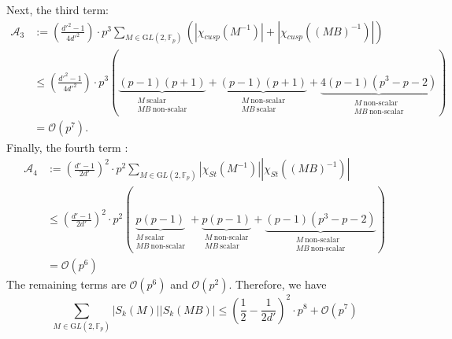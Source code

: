 \documentclass[12pt,reqno]{amsart}
\theoremstyle{plain}
\theoremstyle{definition}
\newcommand{\GL}{{\mathrm GL}}
\newcommand{\sA}{{\mathcal A}}
\newcommand{\sO}{{\mathcal O}}
\theoremstyle{remark}
\newcommand{\FF}{\mathbb{F}}
\begin{document}
Next, the third term: 
\begin{align*}
    \sA_3&:= \left({\frac{d'^2 -1}{4d'^2}}\right)\cdot p^3\sum_{M \in \GL(2, \FF_p)}\left(|\chi_{cusp}(M^{-1})| +|\chi_{cusp}((MB)^{-1})|\right) \\
    &\leq \left({\frac{d'^2 -1}{4d'^2}}\right)\cdot p^3 \left(\underbrace{(p-1)(p+1)}_{\substack{M ~ \text{scalar}\\MB~\text{non-scalar}}} + \underbrace{(p-1)(p+1)}_{\substack{M~ \text{non-scalar}\\MB ~\text{scalar}}} + \underbrace{4(p-1)(p^3-p-2)}_{\substack{M~ \text{non-scalar}\\ MB ~\text{non-scalar}}} \right)\\
    &= \sO(p^7).
\end{align*}
Finally, the fourth term :
\begin{align*}
    \sA_4&:= \left({\frac{d' -1}{2d'}}\right)^2\cdot p^2 \sum_{M \in \GL(2, \FF_p)}|\chi_{St}(M^{-1})||\chi_{St}((MB)^{-1})|\\
    & \leq \left({\frac{d' -1}{2d'}}\right)^2\cdot p^2 \left(\underbrace{p(p-1)}_{\substack{M~ \text{scalar}\\ MB ~\text{non-scalar}}}+\underbrace{p(p-1)}_{\substack{M~ \text{non-scalar}\\ MB ~\text{scalar}}}+ \underbrace{(p-1)(p^3-p-2)}_{\substack{M~ \text{non-scalar}\\ MB ~\text{non-scalar}}} \right)\\
    &=\sO(p^6)
\end{align*}
The remaining terms are $\sO(p^6)$ and $\sO(p^2)$. Therefore, we have 
\begin{equation}\label{eq: nonsingular count}
    \sum_{M \in \GL(2, \FF_p)}|S_k(M)||S_k(MB)|\leq \left(\frac{1}{2}-\frac{1}{2d'}\right)^2\cdot p^8 + \sO(p^7)
\end{equation}
\end{document}
